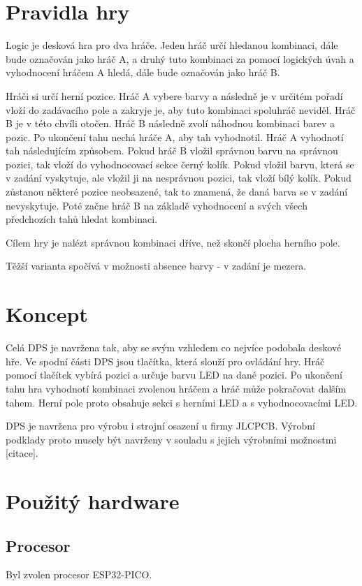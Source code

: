 \chapter{Pravidla hry}
Logic je desková hra pro dva hráče. Jeden hráč určí hledanou kombinaci, dále bude označován jako hráč A, a druhý tuto kombinaci za pomocí logických úvah a
vyhodnocení hráčem A hledá, dále bude označován jako hráč B.

Hráči si určí herní pozice. Hráč A vybere barvy a následně je v určitém pořadí vloží do zadávacího pole a zakryje je, aby tuto
kombinaci spoluhráč neviděl. Hráč B je v této chvíli otočen. Hráč B následně zvolí náhodnou kombinaci barev a pozic. Po ukončení tahu nechá
hráče A, aby tah vyhodnotil. Hráč A vyhodnotí tah následujícím způsobem. Pokud hráč B vložil správnou barvu na správnou pozici, tak vloží 
do vyhodnocovací sekce černý kolík. Pokud vložil barvu, která se v zadání vyskytuje, ale vložil ji na nesprávnou pozici, tak vloží bílý kolík.
Pokud zůstanou některé pozice neobsazené, tak to znamená, že daná barva se v zadání nevyskytuje. Poté začne hráč B na základě vyhodnocení a 
svých všech předchozích tahů hledat kombinaci.

Cílem hry je nalézt správnou kombinaci dříve, než skončí plocha herního pole.

Těžší varianta spočívá v možnosti absence barvy - v zadání je mezera.

\chapter{Koncept}
Celá DPS je navržena tak, aby se svým vzhledem co nejvíce podobala deskové hře. Ve spodní části DPS jsou tlačítka, která
slouží pro ovládání hry.
Hráč pomocí tlačítek vybírá pozici a určuje barvu LED na dané pozici. Po ukončení tahu hra vyhodnotí kombinaci zvolenou hráčem
a hráč může pokračovat dalším tahem.
Herní pole proto obsahuje sekci s herními LED a s vyhodnocovacími LED.

DPS je navržena pro výrobu i strojní osazení u firmy JLCPCB. Výrobní podklady proto musely být navrženy v souladu
s jejich výrobními možnostmi [citace].

\chapter{Použitý hardware}
\section{Procesor}
Byl zvolen procesor ESP32-PICO.
